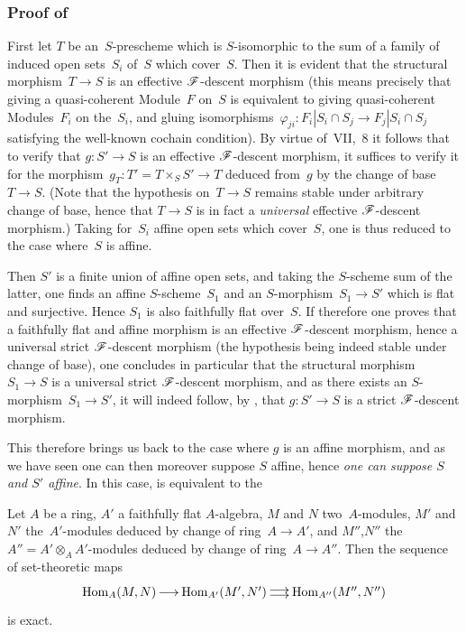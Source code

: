\subsubsection*{Proof of~}
First let
$T$ be an~$S$-prescheme which is $S$-isomorphic to
the sum of a family
of
induced open sets~$S_{i}$ of~$S$ which cover~$S$. Then it is evident
that the structural morphism~$T\to S$ is an effective
$\cal{F}$-descent morphism (this means precisely that
giving a quasi-coherent Module~$F$ on~$S$ is equivalent
to giving quasi-coherent Modules~$F_{i}$ on
the~$S_{i}$, and gluing isomorphisms~$\varphi_{ji}\colon
F_{i}|S_{i}\cap S_{j}\to F_{j}|S_{i}\cap S_{j}$ satisfying the
well-known cochain condition). By virtue of~VII,~8
it follows that to verify that $g\colon S'\to S$ is an
effective $\cal{F}$-descent morphism, it suffices to
verify it for the morphism~$g_{T}\colon T'=T\times_{S}S'\to T$
deduced from~$g$ by the change of base~$T\to S$. (Note that
the hypothesis on~$T\to S$ remains stable under arbitrary change of base,
hence that $T\to S$ is in fact a \emph{universal} effective
$\cal{F}$-descent morphism.) Taking for~$S_{i}$
affine open sets which cover~$S$, one is thus reduced to the case
where~$S$ is affine.

Then $S'$ is a finite union of affine open sets, and taking the
$S$-scheme sum of the latter, one finds an affine
$S$-scheme~$S_{1}$ and an $S$-morphism~$S_{1}\to S'$ which is flat and
surjective. Hence $S_{1}$ is also faithfully flat over~$S$. If therefore
one proves that a faithfully flat and affine morphism is an
effective $\cal{F}$-descent morphism, hence a
universal strict $\cal{F}$-descent morphism (the hypothesis being indeed
stable under change of base), one concludes in particular that
the structural morphism~$S_{1}\to S$ is a
universal strict $\cal{F}$-descent morphism, and as there exists an
$S$-morphism~$S_{1}\to S'$, it will indeed follow, by \cite{VIII.D}, that
$g\colon S'\to S$ is a strict $\cal{F}$-descent morphism.

This therefore brings us back to the case where $g$ is an affine morphism,
and as we have seen one can then moreover suppose $S$ affine, hence
\emph{one can suppose $S$ and $S'$ affine}. In this case,
 is equivalent to the

\begin{lemma}
\label{VIII.1.4}
Let $A$ be a ring, $A'$ a faithfully flat $A$-algebra,
$M$ and $N$ two~$A$-modules, $M'$ and $N'$ the~$A'$-modules deduced
by change of ring~$A\to A'$, and $M''$,$N''$
the~$A''=A'\otimes_{A}A'$-modules deduced by change
of ring~$A\to A''$. Then the sequence of set-theoretic maps
$$
\xymatrix@C=.5cm{\Hom_{A}(M,N)\ar[r] &
\Hom_{A'}(M',N')\ar@<2pt>[r]\ar@<-2pt>[r] & \Hom_{A''}(M'',N'')}
$$
is exact.
\end{lemma}

